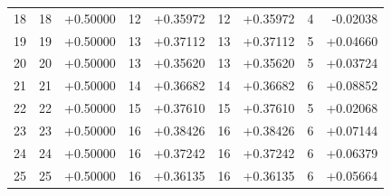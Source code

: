 \documentclass[11pt]{article}
\begin{document}
\begin{center}
\begin{longtable}{r rr rr rr rr}
18 & 18 & +0.50000 & 12 & +0.35972 & 12 & +0.35972 & 4 & -0.02038\\
19 & 19 & +0.50000 & 13 & +0.37112 & 13 & +0.37112 & 5 & +0.04660\\
20 & 20 & +0.50000 & 13 & +0.35620 & 13 & +0.35620 & 5 & +0.03724\\
21 & 21 & +0.50000 & 14 & +0.36682 & 14 & +0.36682 & 6 & +0.08852\\
22 & 22 & +0.50000 & 15 & +0.37610 & 15 & +0.37610 & 5 & +0.02068\\
23 & 23 & +0.50000 & 16 & +0.38426 & 16 & +0.38426 & 6 & +0.07144\\
24 & 24 & +0.50000 & 16 & +0.37242 & 16 & +0.37242 & 6 & +0.06379\\
25 & 25 & +0.50000 & 16 & +0.36135 & 16 & +0.36135 & 6 & +0.05664\\
\bottomrule\end{longtable}\end{center}
\end{document}
